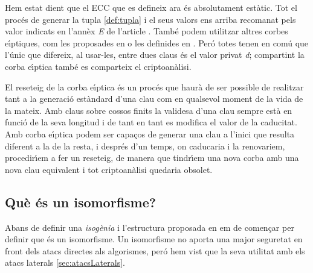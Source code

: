 \documentclass[12pt,twoside,catalan,a4paper]{book}%
\numberwithin{figure}{section}		%
\theoremstyle{definition}   			%
\def\ce{corba e\lgem{}\'{\i}ptica}%
\def\ces{corbes e\lgem{}\'{\i}ptiques}%
\def\cfs{cossos finits}%
\theoremstyle{saltolinea}   			%
\begin{document}
Hem estat dient que el ECC que es defineix ara \'es absolutament est\`atic. Tot el proc\'es de generar la tupla \ref{def:tupla} i el seus valors ens arriba recomanat pels valor indicats en l'ann\`ex \emph{E} de l'article \cite{NIST186}. Tamb\'e podem utilitzar altres \ces, com les proposades en \cite{brainpool} o les definides en \cite{sec2}. Per\'o totes tenen en com\'u que l'\'unic que difereix, al usar-les, entre dues claus \'es el valor privat \emph{d}; compartint la \ce{} tamb\'e es comparteix el criptoan\`alisi.

El reseteig de la \ce{} \'es un proc\'es que haur\`a de ser possible de realitzar tant a la generaci\'o est\`andard d'una clau com en qualsevol moment de la vida de la mateix. Amb claus sobre \cfs{} la validesa d'una clau sempre est\`a en funci\'o de la seva longitud i de tant en tant es modifica el valor de la caducitat. Amb \ce{} podem ser capa\c{c}os de generar una clau a l'inici que resulta diferent a la de la resta, i despr\'es d'un temps, on caducaria i la renovariem, procedir\'{\i}em a fer un reseteig, de manera que tindr\'{\i}em una nova corba amb una nova clau equivalent i tot criptoan\`alisi quedaria obsolet.

\subsection{Qu\`e \'es un isomorfisme?}\label{subsec:isomorf}

Abans de definir una \emph{isog\`enia} i l'estructura proposada en \cite{PkIso} em de comen\c{c}ar per definir que \'es un isomorfisme. Un isomorfisme no aporta una major seguretat en front dels atacs directes als algorismes, per\'o hem vist que la seva utilitat amb els atacs laterals \ref{sec:atacsLaterals}.
\end{document}

